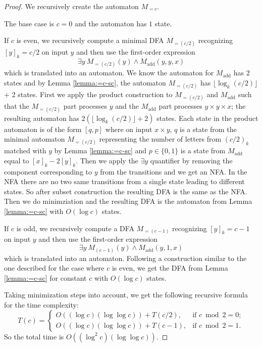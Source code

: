 \documentclass[12pt,reqno]{article}
\def\add{\text{add}}
\begin{document}
\begin{proof}
    We recursively create the automaton $M_{=c}$.

    The base case is $c=0$ and the automaton has $1$ state.
    
    If $c$ is even, we recursively compute a minimal DFA $M_{=(c/2)}$ recognizing $[y]_k = c/2$ on input $y$ and then use the first-order expression
    \[
    \exists y \ M_{=(c/2)}(y) \land M_{\add}(y, y, x)
    \]
    which is translated into an automaton.  We know the automaton for $M_{\add}$ has $2$ states and by Lemma \ref{lemma:=c-sc}, the automaton $M_{=(c/2)}$ has $\lfloor \log_k (c/2) \rfloor$ + 2 states. First we apply the product construction to $M_{=(c/2)}$ and $M_{\add}$ such that the $M_{=(c/2)}$ part processes $y$ and the $M_{\add}$ part processes $y \times y \times x$; the resulting automaton has $2 (\lfloor \log_k (c/2) \rfloor + 2)$ states. Each state in the product automaton is of the form $[q, p]$ where on input $x \times y$, $q$ is a state from the minimal automaton $M_{=(c/2)}$ representing the number of letters from $(c/2)_k$ matched with $y$ by Lemma \ref{lemma:=c-sc} and $p \in \{0, 1\}$ is a state from $M_{\add}$ equal to $[x]_k - 2[y]_k$. 
    Then we apply the $\exists y$ quantifier by removing the component corresponding to $y$ from the transitions and we get an NFA. In the NFA there are no two same transitions from a single state leading to different states. So after subset construction the resulting DFA is the same as the NFA. Then we do minimziation and the resulting DFA is the automaton from Lemma \ref{lemma:=c-sc} with $O(\log c)$ states.
    
    If $c$ is odd, we recursively compute a DFA $M_{=(c-1)}$ recognizing $[y]_k = c-1$ on input $y$ and then use the first-order expression
    \[
    \exists y \ M_{(c-1)}(y) \land M_{\add}(y, 1, x)
    \]
    which is translated into an automaton. Following a construction similar to the one described for the case where $c$ is even, we get the DFA from Lemma \ref{lemma:=c-sc} for constant $c$ with $O(\log c)$ states.

    Taking minimization steps into account, we get the following recursive formula for the time complexity:
    \[  T(c) =
\begin{cases}
     O((\log c) (\log \log c)) + T(c/2), & \text{if $c \bmod 2 = 0$}; \\
    O((\log c) (\log \log c))  + T(c-1), & \text{if $c \bmod 2 = 1$}.
\end{cases}
\]
So the total time is $ O((\log^2  c) (\log \log c))$.
\end{proof}
\end{document}
